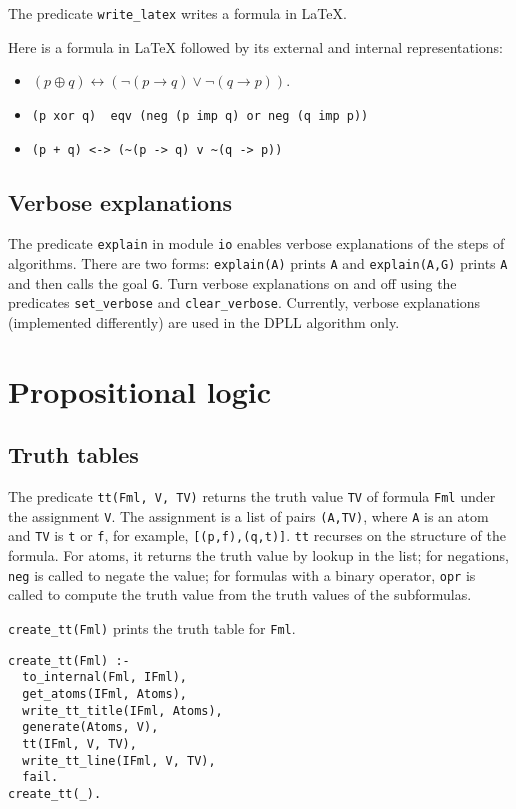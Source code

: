 \documentclass[11pt]{article}
\newcommand*{\p}[1]{\textup{\texttt{#1}}}
\begin{document}
The predicate \p{write\_latex} writes a formula in \LaTeX{}.

Here is a formula in \LaTeX{} followed by its external and internal representations:
\begin{itemize}
\item $(p \oplus q)  \leftrightarrow (\neg (p \rightarrow q) \vee \neg (q\rightarrow p) )$.
\item \verb+(p xor q)  eqv (neg (p imp q) or neg (q imp p))+
\item \verb=(p + q) <-> (~(p -> q) v ~(q -> p))=
\end{itemize}

\subsection{Verbose explanations}

The predicate \p{explain} in module \p{io} enables verbose explanations
of the steps of algorithms. There are two forms: \p{explain(A)} prints
\p{A} and \p{explain(A,G)} prints \p{A} and then calls the goal \p{G}.
Turn verbose explanations on and off using the predicates
\p{set\_verbose} and \p{clear\_verbose}. Currently, verbose explanations
(implemented differently) are used in the DPLL algorithm only.


\newpage

\section{Propositional logic}

\subsection{Truth tables}\label{s.tt}

The predicate \p{tt(Fml, V, TV)} returns the truth value \p{TV} of
formula \p{Fml} under the assignment \p{V}. The assignment is a list of
pairs \p{(A,TV)}, where \p{A} is an atom and \p{TV} is \p{t} or \p{f},
for example, \p{[(p,f),(q,t)]}. \p{tt} recurses on the structure of the
formula. For atoms, it returns the truth value by lookup in the list;
for negations, \p{neg} is called to negate the value; for formulas with
a binary operator, \p{opr} is called to compute the truth value from the
truth values of the subformulas.

\p{create\_tt(Fml)} prints the truth table for \p{Fml}.
\begin{verbatim}
create_tt(Fml) :-
  to_internal(Fml, IFml),
  get_atoms(IFml, Atoms),
  write_tt_title(IFml, Atoms),
  generate(Atoms, V),
  tt(IFml, V, TV),
  write_tt_line(IFml, V, TV),
  fail.
create_tt(_).
\end{verbatim}
\end{document}
